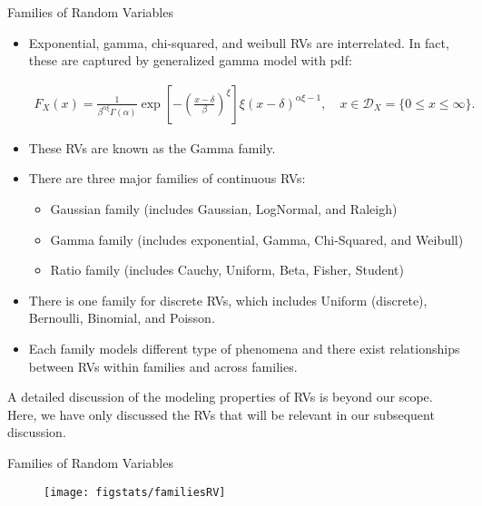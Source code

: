 \documentclass[9pt]{beamer}
\begin{document}
%
\begin{frame}{Families of Random Variables}
\begin{itemize}
\setlength{\itemsep}{5pt}
\item Exponential, gamma, chi-squared, and weibull RVs are interrelated. In fact, these are captured by generalized gamma model with pdf:
\begin{block}{}
\begin{align*}
F_X(x)=\frac{1}{\beta^{\alpha\xi}\Gamma(\alpha)}\exp\left[-\left(\frac{x-\delta}{\beta}\right)^\xi\right]\xi(x-\delta)^{\alpha\xi-1},\quad x\in \mathcal{D}_X=\{0\leq x\leq \infty\}.
\end{align*}
\end{block}
\item These RVs are known as the Gamma family. 
\item There are three major families of continuous RVs: 
\begin{itemize}
\item Gaussian family (includes Gaussian, LogNormal, and Raleigh)
\item Gamma family (includes exponential, Gamma, Chi-Squared, and Weibull)
\item Ratio family (includes Cauchy, Uniform, Beta, Fisher, Student)
\end{itemize}

\item There is one family for discrete RVs, which includes Uniform (discrete), Bernoulli, Binomial, and Poisson.

\item Each family models different type of phenomena and there exist relationships between RVs within families and across families. 

\end{itemize}
A detailed discussion of the modeling properties of RVs is beyond our scope. Here, we have only discussed the RVs that will be relevant in our subsequent discussion. 

\end{frame}

%
\begin{frame}{Families of Random Variables}

\begin{figure}[!htb]
    \centering
	\texttt{[image: figstats/familiesRV]}
\end{figure}

\end{frame}
\end{document}
